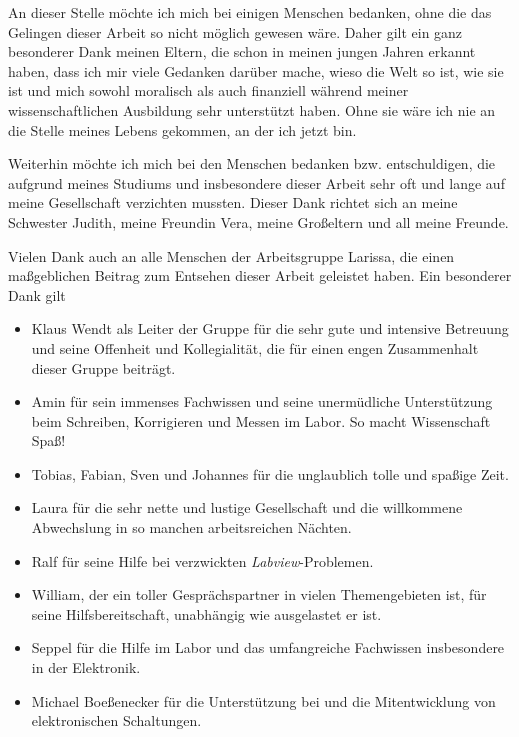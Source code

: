 An dieser Stelle möchte ich mich bei einigen Menschen bedanken, ohne die das
Gelingen dieser Arbeit so nicht möglich gewesen wäre. Daher gilt ein ganz
besonderer Dank meinen Eltern, die schon in meinen jungen Jahren erkannt haben,
dass ich mir viele Gedanken darüber mache, wieso die Welt so ist, wie sie ist
und mich sowohl moralisch als auch finanziell während meiner wissenschaftlichen
Ausbildung sehr unterstützt haben. Ohne sie wäre ich nie an die Stelle meines
Lebens gekommen, an der ich jetzt bin.\par
Weiterhin möchte ich mich bei den Menschen bedanken bzw. entschuldigen, die
aufgrund meines Studiums und insbesondere dieser Arbeit sehr oft und lange auf
meine Gesellschaft verzichten mussten. Dieser Dank richtet sich an meine
Schwester Judith, meine Freundin Vera, meine Großeltern und all meine
Freunde.\par
Vielen Dank auch an alle Menschen der Arbeitsgruppe Larissa, die einen
maßgeblichen Beitrag zum Entsehen dieser Arbeit geleistet haben. Ein besonderer
Dank gilt
\begin{itemize}
     \item Klaus Wendt als Leiter der Gruppe für die sehr gute und intensive
     Betreuung und seine Offenheit und Kollegialität, die für einen engen
     Zusammenhalt dieser Gruppe beiträgt.
     \item Amin für sein immenses Fachwissen und seine unermüdliche
     Unterstützung beim Schreiben, Korrigieren und Messen im Labor. So macht Wissenschaft Spaß!
     \item Tobias, Fabian, Sven und Johannes für die unglaublich tolle und
     spaßige Zeit.
     \item Laura für die sehr nette und lustige Gesellschaft und die willkommene
     Abwechslung in so manchen arbeitsreichen Nächten.
     \item Ralf für seine Hilfe bei verzwickten \textit{Labview}-Problemen.
     \item William, der ein toller Gesprächspartner in vielen Themengebieten
     ist, für seine Hilfsbereitschaft, unabhängig wie ausgelastet er ist.
     \item Seppel für die Hilfe im Labor und das umfangreiche Fachwissen
     insbesondere in der Elektronik.
     \item Michael Boeßenecker für die Unterstützung bei und die Mitentwicklung
     von elektronischen Schaltungen.
\end{itemize}
